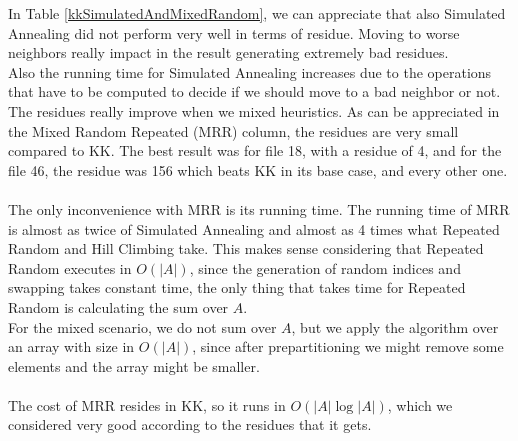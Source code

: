 \documentclass[tikz, 12pt]{scrartcl}
\begin{document}
In Table \ref{kkSimulatedAndMixedRandom}, we can appreciate that also Simulated Annealing did not perform very well in terms of residue. Moving to worse neighbors really impact in the result generating extremely bad residues. \\
Also the running time for Simulated Annealing increases due to the operations that have to be computed to decide if we should move to a bad neighbor or not.\\
The residues really improve when we mixed heuristics. As can be appreciated in the Mixed Random Repeated (MRR) column, the residues are very small compared to KK. The best result was for file 18, with a residue of 4, and for the file 46, the residue was 156 which beats KK in its base case, and every other one.\\
\\
The only inconvenience with MRR is its running time. The running time of MRR is almost as twice of Simulated Annealing and almost as 4 times what Repeated Random and Hill Climbing take. This makes sense considering that Repeated Random executes in $O(|A|)$, since the generation of random indices and swapping takes constant time, the only thing that takes time for Repeated Random is calculating the sum over $A$.\\
For the mixed scenario, we do not sum over $A$, but we apply the algorithm over an array with size in $O(|A|)$, since after prepartitioning we might remove some elements and the array might be smaller.\\
\\
The cost of MRR resides in KK, so it runs in $O(|A| \log |A|)$, which we considered very good according to the residues that it gets. 
\end{document}
